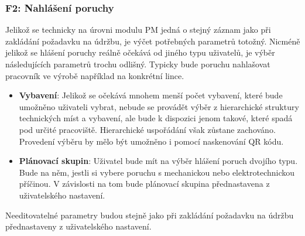 \documentclass[thesis=M,czech]{FITthesis}[2012/06/26]
\begin{document}
\subsubsection{F2: Nahlášení poruchy}
Jelikož se technicky na úrovni modulu PM jedná o stejný záznam jako při zakládání požadavku na údržbu, je výčet potřebných parametrů totožný. Nicméně jelikož se hlášení poruchy reálně očekává od jiného typu uživatelů, je výběr následujících parametrů trochu odlišný. Typicky bude poruchu nahlašovat pracovník ve výrobě například na konkrétní lince. 
\begin{itemize}
	\item
	\textbf{Vybavení}: Jelikož se očekává mnohem menší počet vybavení, které bude umožněno uživateli vybrat, nebude se provádět výběr z hierarchické struktury technických míst a vybavení, ale bude k dispozici jenom takové, které spadá pod určité pracoviště. Hierarchické uspořádání však zůstane zachováno. Provedení výběru by mělo být umožněno i pomocí naskenování QR kódu.  
	\item
	\textbf{Plánovací skupin}: Uživatel bude mít na výběr hlášení poruch dvojího typu. Bude na něm, jestli si vybere poruchu s mechanickou nebo elektrotechnickou příčinou. V závislosti na tom bude plánovací skupina přednastavena z uživatelského nastavení.
\end{itemize} 
Needitovatelné parametry budou stejně jako při zakládání požadavku na údržbu přednastaveny z uživatelského nastavení.
\end{document}
